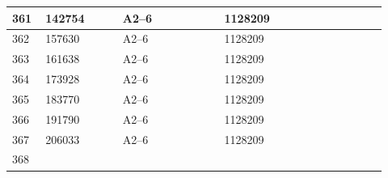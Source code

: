 \documentclass[UTF8,10pt,a4paper,fontset=fandol]{ctexart}
\newcommand{\fieldvalue}[1]{#1}
\begin{document}
\begin{center}
\begin{tabular}{|p{0.08\linewidth}|p{0.19\linewidth}|p{0.25\linewidth}|p{0.25\linewidth}|p{0.15\linewidth}|}
\fieldvalue{361} &
\fieldvalue{142754} &
\fieldvalue{A2--6} &
\fieldvalue{1128209} & \\ \hline
\fieldvalue{362} &
\fieldvalue{157630} &
\fieldvalue{A2--6} &
\fieldvalue{1128209} & \\ \hline
\fieldvalue{363} &
\fieldvalue{161638} &
\fieldvalue{A2--6} &
\fieldvalue{1128209} & \\ \hline
\fieldvalue{364} &
\fieldvalue{173928} &
\fieldvalue{A2--6} &
\fieldvalue{1128209} & \\ \hline
\fieldvalue{365} &
\fieldvalue{183770} &
\fieldvalue{A2--6} &
\fieldvalue{1128209} & \\ \hline
\fieldvalue{366} &
\fieldvalue{191790} &
\fieldvalue{A2--6} &
\fieldvalue{1128209} & \\ \hline
\fieldvalue{367} &
\fieldvalue{206033} &
\fieldvalue{A2--6} &
\fieldvalue{1128209} & \\ \hline
\fieldvalue{368} &

\end{tabular}
\end{center}
\end{document}
